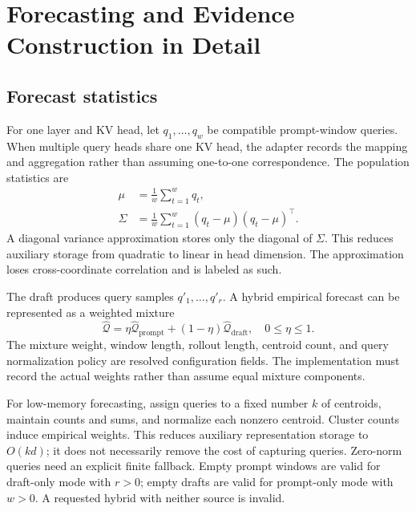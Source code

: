 \section{Forecasting and Evidence Construction in Detail}
\label{app:forecast}
\subsection{Forecast statistics}
For one layer and KV head, let $q_1,\ldots,q_w$ be compatible prompt-window
queries. When multiple query heads share one KV head, the adapter records the
mapping and aggregation rather than assuming one-to-one correspondence.
The population statistics are
\begin{align}
 \mu&=\frac1w\sum_{t=1}^w q_t,\\
 \Sigma&=\frac1w\sum_{t=1}^w(q_t-\mu)(q_t-\mu)^\top.
\end{align}
A diagonal variance approximation stores only the diagonal of $\Sigma$.
This reduces auxiliary storage from quadratic to linear in head dimension.
The approximation loses cross-coordinate correlation and is labeled as such.

The draft produces query samples $q'_1,\ldots,q'_r$. A hybrid empirical forecast
can be represented as a weighted mixture
\begin{equation}
 \widehat{\mathcal Q}
 =\eta\widehat{\mathcal Q}_{\mathrm{prompt}}
 +(1-\eta)\widehat{\mathcal Q}_{\mathrm{draft}},\quad 0\le\eta\le1.
\end{equation}
The mixture weight, window length, rollout length, centroid count, and query
normalization policy are resolved configuration fields. The implementation
must record the actual weights rather than assume equal mixture components.

For low-memory forecasting, assign queries to a fixed number $k$ of centroids,
maintain counts and sums, and normalize each nonzero centroid. Cluster counts
induce empirical weights. This reduces auxiliary representation storage to
$O(kd)$; it does not necessarily remove the cost of capturing queries.
Zero-norm queries need an explicit finite fallback. Empty prompt windows are
valid for draft-only mode with $r>0$; empty drafts are valid for prompt-only
mode with $w>0$. A requested hybrid with neither source is invalid.

